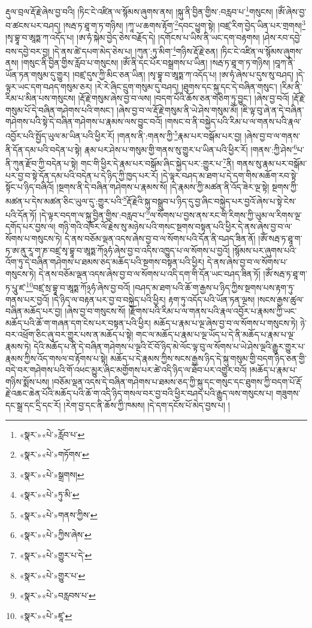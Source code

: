 རྡུལ་བྲལ་རྡོ་རྗེ་ཞེས་བྱ་བའི། །ཏིང་ངེ་འཛིན་ལ་སྙོམས་ཞུགས་ནས། །སྐུ་ནི་བྱིན་གྱིས་:བརླབ་པ་\footnote{«སྣར་»«པེ་»རློབ་པ་}གསུངས། །ཨོཾ་ཞེས་བྱ་བ་ཚངས་པར་བཤད། །སརྦ་ཏ་ཐཱ་ག་ཏ་གཉིས། །ཀཱ་ཡ་ཆགས་རྟོག་\footnote{«སྣར་»«པེ་»གཏོགས་}དབང་ཕྱུག་སྟེ། །བཛྲ་རིག་བྱེད་ཡིན་པར་གྲགས།\footnote{«སྣར་»«པེ་»སྒྲགས།} །སྭ་བྷཱ་བ་ཨཱཏྨ་ཀ་འདོད་པ། །ཨ་ཧཾ་སྐེམ་བྱེད་ཅེས་བརྗོད་དེ། །དགོངས་པ་ཡིས་ནི་ཡང་དག་བརྟགས། །ཤེས་རབ་དབྱེ་བས་དབྱེ་བར་བྱ། །དེ་ནས་ཚེ་དཔག་མེད་ཅེས་པ། །ཀུན་:ཏུ་མིག་\footnote{«སྣར་»«པེ་»ཏུ་མི་}གཉིས་རྡོ་རྗེ་ཅན། །ཏིང་ངེ་འཛིན་ལ་སྙོམས་ཞུགས་ནས། །གསུང་ནི་བྱིན་གྱིས་རློབ་པ་གསུངས། །ཨོཾ་ནི་དང་པོར་བསྒྲགས་པ་ཡིན། །སརྦ་ཏ་ཐཱ་ག་ཏ་གཉིས། །བཱཀ་ནི་ཡོན་ཏན་གསུམ་དུ་གྱུར། །བཛྲ་དུས་ཀྱི་མིང་ཅན་ཡིན། །སྭ་བྷཱ་བ་ཨཱཏྨ་ཀ་འདོད་པ། །ཨ་ཧཾ་ཞེས་པ་དུས་སུ་བཤད། །དེ་ལྟར་ཡང་དག་བཤད་གསུམ་ཅར། །རེ་རེ་ཞིང་དྲུག་གསུམ་དུ་བཤད། །ཐུགས་དང་སྐུ་དང་དེ་བཞིན་གསུང་། །རིམ་ནི་རིམ་པ་མིན་པས་གསུངས། །རྡོ་རྗེ་གསུམ་ཞེས་བྱ་བ་ལས། །བདག་པོའི་ཆོས་ཅན་གཅིག་ཏུ་བྱུང་། །ཞེས་བྱ་བའོ། །རྡོ་རྗེ་གསུམ་པོ་དེ་བཞིན་གཤེགས་པའི་གསང་། །ཞེས་བྱ་བ་ལ་རྡོ་རྗེ་གསུམ་ནི་ཡེ་ཤེས་གསུམ་མོ། །ཇི་ལྟ་བུ་ཞེ་ན་དེ་བཞིན་གཤེགས་པའི་སྟེ་དེ་བཞིན་གཤེགས་པ་རྣམས་ལས་བྱུང་བའོ། །གསང་བ་ནི་བསྐྱེད་པའི་རིམ་པ་ལ་གནས་པའི་རྣལ་འབྱོར་པའི་སྤྱོད་ཡུལ་མ་ཡིན་པའི་ཕྱིར་རོ། །གནས་ནི་:གནས་ཀྱི་\footnote{«སྣར་»«པེ་»གནས་ཀྱིས་}རྣམ་པར་བསྒོམ་པར་བྱ། །ཞེས་བྱ་བ་ལ་གནས་ནི་དོན་དམ་པའི་བདེན་པ་སྟེ། རྣམ་པར་ཤེས་པ་གསུམ་གྱི་གནས་སུ་གྱུར་པ་ཡིན་པའི་ཕྱིར་རོ། །གནས་:ཀྱི་ཤེས་\footnote{«སྣར་»«པེ་»ཀྱིས་ཞེས་}པ་ནི་ཀུན་རྫོབ་ཀྱི་བདེན་པ་སྟེ། གང་གི་ཕྱིར་དེ་རྣམ་པར་བསྒོམ་ཞིང་སྐྱེད་པར་:གྱུར་པ་\footnote{«སྣར་»«པེ་»གྱུར་པ་དེ་}ནི། གནས་སུ་རྣམ་པར་བསྒོམ་པར་བྱ་བ་སྟེ་དོན་དམ་པའི་བདེན་པ་དེ་ཉིད་ཀྱི་ཁྱད་པར་རོ། །དེ་ལྟར་བཤད་མ་ཐག་པ་དེ་དག་གིས་མཆོག་རབ་སྟེ་སྟོང་པ་ཉིད་བཞིའོ། །སྔགས་ནི་དེ་བཞིན་གཤེགས་པ་རྣམས་སོ། །དེ་རྣམས་ཀྱི་མཚན་ནི་འོད་ཟེར་ལྔ་སྟེ། སྔགས་ཀྱི་མཚན་པ་དེས་མཚན་ཅིང་ཡུལ་དུ་:གྱུར་པའི་\footnote{«སྣར་»«པེ་»གྱུར་པ་}རྡོ་རྗེའི་སྐུ་བསྒྲུབ་པ་ཉིད་དུ་བྱ་ཞིང་བསྐྱེད་པར་བྱའོ་ཞེས་པ་སྟེ་ངེས་པའི་དོན་ཏོ། །དེ་ལྟར་བདག་ལ་སྐུ་བྱིན་གྱིས་:བརླབ་པ་\footnote{«སྣར་»«པེ་»བརླབས་པ་}ལ་སོགས་པ་བྱས་ནས་རང་གི་རིགས་ཀྱི་ཡུམ་ལ་རིགས་ལྔ་དགོད་པར་བྱས་ལ། གཉི་གའི་འཁོར་ལོ་རྗེས་སུ་མཉེས་པའི་གསང་སྔགས་བསྟན་པའི་ཕྱིར་དེ་ནས་ཞེས་བྱ་བ་ལ་སོགས་པ་གསུངས་ཏེ། དེ་ནས་བཅོམ་ལྡན་འདས་ཞེས་བྱ་བ་ལ་སོགས་པའི་དོན་ནི་བཤད་ཟིན་ནོ། །ཨོཾ་སརྦ་ཏ་ཐཱ་ག་ཏ་ཨ་ནུ་རཱ་ག་ཎ་བཛྲ་སྭ་བྷཱ་བ་ཨཱཏྨ་ཀོ྅ཧཾ་ཞེས་བྱ་བ་འདིས་འཁྱུད་པ་ལ་སོགས་པ་བྱའོ། །སྙོམས་པར་ཞུགས་པའི་འོག་ཏུ་དེ་བཞིན་གཤེགས་པ་ཐམས་ཅད་མཆོད་པའི་སྔགས་བསྟན་པའི་ཕྱིར། དེ་ནས་ཞེས་བྱ་བ་ལ་སོགས་པ་གསུངས་ཏེ། དེ་ནས་བཅོམ་ལྡན་འདས་ཞེས་བྱ་བ་ལ་སོགས་པ་འདི་དག་གི་དོན་ཡང་བཤད་ཟིན་ཏོ། །ཨོཾ་སརྦ་ཏ་ཐཱ་ག་ཏ་པཱུ་ཛ་\footnote{«སྣར་»«པེ་»ཛཱ་}བཛྲ་སྲ་བྷཱ་བ་ཨཱཏྨ་ཀོ྅ཧཾ་ཞེས་བྱ་བའོ། །བཤད་མ་ཐག་པའི་ཆོ་ག་རྒྱས་པ་ཉིད་ཀྱིས་སྔགས་པས་རྟག་ཏུ་གནས་པར་བྱའོ། །དེ་ཉིད་ལ་བརྟན་པར་བྱ་བ་བསྐྱེད་པའི་ཕྱིར། རྟག་ཏུ་འདོད་པའི་ཡོན་ཏན་ལྔས། །སངས་རྒྱས་ཚུལ་བཞིན་མཆོད་པར་བྱ། །ཞེས་བྱ་བ་གསུངས་སོ། །རྫོགས་པའི་རིམ་པ་ལ་གནས་པའི་རྣལ་འབྱོར་པ་རྣམས་ཀྱི་ཡང་མཆོད་པའི་ཆོ་ག་གཞན་དག་ངེས་པར་བསྟན་པའི་ཕྱིར། མཆོད་པ་རྣམ་པ་ལྔ་ཞེས་བྱ་བ་ལ་སོགས་པ་གསུངས་ཏེ། ཉེ་བར་འཕྲོག་ཅིང་ཞུ་བར་གྱུར་པས་ན་མཆོད་པ་སྟེ། གང་ལ་མཆོད་པ་རྣམ་པ་ལྔ་ཡོད་པ་དེ་ནི་མཆོད་པ་རྣམ་པ་ལྔ་རྣམས་ཏེ། དེའི་མཆོད་པ་ནི་དེ་བཞིན་གཤེགས་པ་ལྔའི་ངོ་བོ་ཉིད་མེ་ལོང་ལྟ་བུ་ལ་སོགས་པ་ཡེ་ཤེས་ལྔའི་རྒྱུར་གྱུར་པ་རྣམས་ཀྱིས་འོད་གསལ་བ་རྟོགས་པ་སྟེ། མཆོད་པ་དེ་རྣམས་ཀྱིས་སངས་རྒྱས་ཉིད་དེ་སྐུ་གསུམ་གྱི་བདག་ཉིད་ཅན་གྱི་བདེ་བར་གཤེགས་པའི་གོ་འཕང་མྱུར་ཞིང་མགྱོགས་པར་ཚེ་འདི་ཉིད་ལ་ཐོབ་པར་འགྱུར་བའོ། །མཆོད་པ་རྣམ་པ་གཉིས་སྨོས་པས། །བཅོམ་ལྡན་འདས་དེ་བཞིན་གཤེགས་པ་ཐམས་ཅད་ཀྱི་སྐུ་དང་གསུང་དང་ཐུགས་ཀྱི་བདག་པོ་རྡོ་རྗེ་འཆང་ཆེན་པོའི་མཆོད་པའི་ཆོ་ག་འདི་ཉིད་གསལ་བར་བྱ་བའི་ཕྱིར་བཤད་པའི་རྒྱུད་ལས་གསུངས་པ། གཟུགས་དང་སྒྲ་དང་དྲི་དང་རོ། །རེག་བྱ་དང་ནི་ཆོས་ཀྱི་ཁམས། །དེ་དག་དངོས་པོ་མེད་བྱས་པ། །
